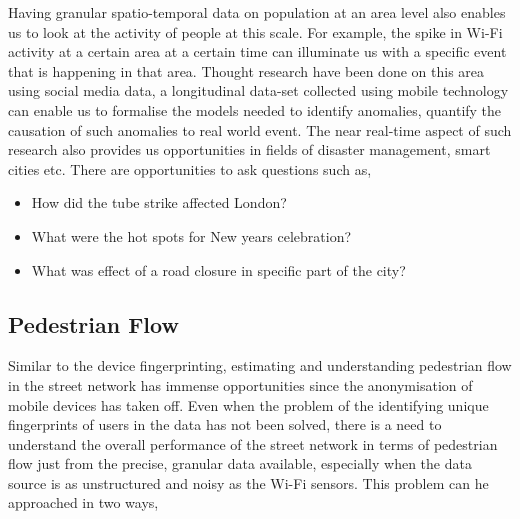 Having granular spatio-temporal data on population at an area level also enables us to look at the activity of people at this scale.
For example, the spike in Wi-Fi activity at a certain area at a certain time can illuminate us with a specific event that is happening in that area.
Thought research have been done on this area using social media data, a longitudinal data-set collected using mobile technology can enable us to formalise the models needed to identify anomalies, quantify the causation of such anomalies to real world event.
The near real-time aspect of such research also provides us opportunities in fields of disaster management, smart cities etc. 
There are opportunities to ask questions such as,


\begin{itemize}
  \setlength{\itemindent}{2em}
  \itemsep-0.25em
  \item How did the tube strike affected London?
  \item What were the hot spots for New years celebration?
  \item What was effect of a road closure in specific part of the city?
\end{itemize}

\subsection{Pedestrian Flow}

Similar to the device fingerprinting, estimating and understanding pedestrian flow in the street network has immense opportunities since the anonymisation of mobile devices has taken off.
Even when the problem of the identifying unique fingerprints of users in the data has not been solved, there is a need to understand the overall performance of the street network in terms of pedestrian flow just from the precise, granular data available, especially when the data source is as unstructured and noisy as the Wi-Fi sensors.
This problem can he approached in two ways,



